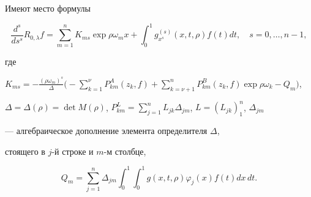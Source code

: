 \begin{lem}


Имеют место формулы


\begin{equation}


\frac {d^s}{ds^s}R_{0,\lambda} f=\sum_{m=1}^nK_{ms}\exp\rho\omega_mx+


\int_0^1g_{x^s}^{(s)}(x,t,\rho)f(t)dt,\quad s=0,\dotsc,n-1,


\end{equation}


где


$K_{ms}=- \frac{(\rho\omega_m)^s}{\Delta}\Big(


-\sum\limits_{k=1}^\nu P_{km}^A(z_k,f)+


\sum\limits_{k=\nu+1}^n P_{km}^B(z_k,f)\exp\rho\omega_k-Q_m\Big)$,


$\Delta=\Delta(\rho)=\det M(\rho)$, $P_{km}^L=\sum\limits_{j=1}^nL_


{jk}\Delta_{jm}$, $L=(L_{jk})_1^n$, $\Delta_{jm}$


--- алгебраическое дополнение элемента определителя $\Delta$,


стоящего в $j$-й строке и $m$-м столбце,


$$


Q_m=\sum\limits_{j=1}^n \Delta_{jm}\int_0^1


\int_0^1g(x,t,\rho)\varphi_j(x)f(t)dx\,dt.


$$


\end{lem}





